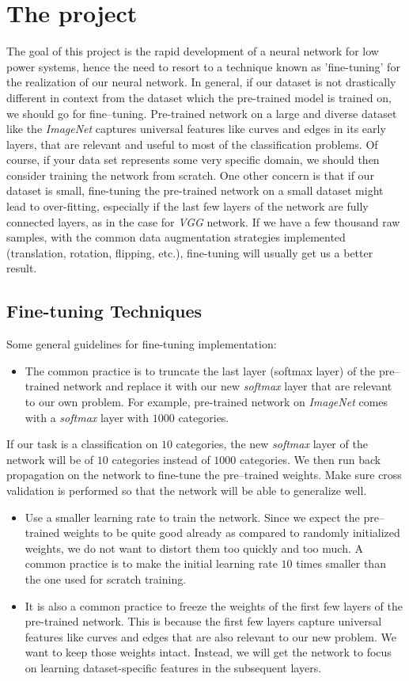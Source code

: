 \section{The project}
\label{sec:project}
The goal of this project is the rapid development of a neural network for low 
power systems, hence the need to resort to a technique known as 
'fine-tuning' for the realization of our neural network.
In general, if our dataset is not drastically different in context from the 
dataset which the pre-trained model is trained on, we should go for 
fine--tuning.
Pre-trained network on a large and diverse dataset like the \emph{ImageNet} 
captures  universal features like curves and edges in its early layers, that are
relevant and useful to most of the classification problems.
Of course, if your data set represents some very specific domain, we should 
then consider training the network from scratch.
One other concern is that if our dataset is small, fine-tuning the pre-trained 
network on a small dataset might lead to over-fitting, especially if the last few 
layers of the network are fully connected layers, as in the case for \emph{VGG} 
network. 
If we have a few thousand raw samples, with the common data augmentation 
strategies implemented (translation, rotation, flipping, etc.), fine-tuning will 
usually get us a better result.
%
\subsection{Fine-tuning Techniques}
\label{subsec:fine-tuning}
Some general guidelines for fine-tuning implementation:
\begin{itemize}
\item The common practice is to truncate the last layer (softmax layer) of the
pre--trained network and replace it with our new \emph{softmax} layer that are
relevant to our own problem. For example, pre-trained network on \emph{ImageNet} 
comes with a \emph{softmax} layer with $1000$ categories.
\end{itemize}
If our task is a classification on $10$ categories, the new \emph{softmax} layer
of the network will be of $10$ categories instead of $1000$ categories.
We then run back propagation on the network to fine-tune the pre--trained 
weights. Make sure cross validation is performed so that the network will be 
able to generalize well.
\begin{itemize}
\item  Use a smaller learning rate to train the network. 
Since we expect the pre--trained weights to be quite good already as compared 
to randomly initialized weights, we do not want to distort them too quickly and 
too much. 
A common practice is to make the initial learning rate $10$ times smaller than 
the one used for scratch training.
\item It is also a common practice to freeze the weights of the first few layers 
of the pre-trained network. 
This is because the first few layers capture universal features like curves and 
edges that are also relevant to our new problem. 
We want to keep those weights intact. Instead, we will get the network to 
focus on learning dataset-specific features in the subsequent layers.
\end{itemize}
%
